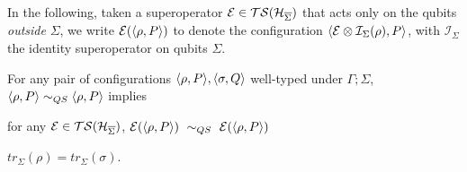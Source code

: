 In the following, taken a superoperator $\mathcal{E} \in \mathcal{TS}(\mathcal{H}_{\overline{\Sigma}})$ that acts only on the qubits \textit{outside} $\Sigma$, we write $\mathcal{E}(\langle\rho, P\rangle)$ to denote the configuration $\langle\mathcal{E}\otimes\mathcal{I}_\Sigma(\rho), P\rangle$, with $\mathcal{I}_\Sigma$ the identity superoperator on qubits $\Sigma$.

\begin{theorem}
	For any pair of configurations $\langle\rho, P\rangle, \langle\sigma, Q\rangle$ well-typed under $\Gamma; \Sigma$, 
	$\langle\rho, P\rangle \sim_{QS} \langle\rho, P\rangle$ implies
	\begin{enumerate}
		{\item for any $\mathcal{E} \in \mathcal{TS}(\mathcal{H}_{\overline{\Sigma}})$, $\mathcal{E} (\langle\rho, P\rangle)\ \sim_{QS} \ \mathcal{E} (\langle\rho, P\rangle)$\label{point:thmchinese1_quantum}}
		{\item $tr_{\Sigma}(\rho) = tr_{\Sigma}(\sigma)$. \label{point:thmchinese2_quantum}}
	\end{enumerate}
\end{theorem}
